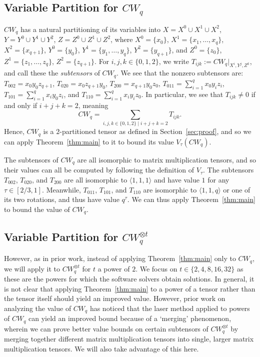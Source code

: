 \PassOptionsToPackage{shortlabels}{enumitem}\documentclass[10pt,a4paper]{article}
\begin{document}
\subsection{Variable Partition for \texorpdfstring{$CW_q$}{CWq}}

$CW_q$ has a natural partitioning of its variables into $X=X^0\cup X^1\cup X^2$, $Y=Y^0\cup Y^1\cup Y^2$, $Z=Z^0\cup Z^1\cup Z^2$, where $X^0=\{x_0\}$, $X^1=\{x_1,\ldots,x_q\}$, $X^2=\{x_{q+1}\}$, $Y^0=\{y_0\}$, $Y^1=\{y_1,\ldots,y_q\}$, $Y^2=\{y_{q+1}\}$, and $Z^0=\{z_0\}$, $Z^1=\{z_1,\ldots,z_q\}$, $Z^2=\{z_{q+1}\}$. 
For $i,j,k \in \{0,1,2\}$, we write $T_{ijk} := CW_q|_{X^i,Y^j,Z^k}$, and call these the \emph{subtensors} of $CW_q$. We see that the nonzero subtensors are: $T_{002}=x_0 y_0 z_{q+1}$, $T_{020}= x_0 z_{q+1} y_0$,  $T_{200}=x_{q+1} y_0 z_0$, $T_{011}=\sum_{i=1}^q x_0 y_i z_i$,  $T_{101}=\sum_{i=1}^q x_i y_0 z_i$, and $T_{110}=\sum_{i=1}^q x_i y_i z_0$. In particular, we see that $T_{ijk} \neq 0$ if and only if $i+j+k=2$, meaning
$$CW_q=\sum_{i,j,k\in \{0,1,2\} \mid i+j+k=2} T_{ijk}.$$
Hence, $CW_q$ is a $2$-partitioned tensor as defined in Section~\ref{sec:proof}, and so we can apply Theorem~\ref{thm:main} to it to bound its value $V_\tau(CW_q)$.

The subtensors of $CW_q$ are all isomorphic to matrix multiplication tensors, and so their values can all be computed by following the definition of $V_\tau$. The subtensors
$T_{002}$, $T_{020}$, and $T_{200}$ are all isomorphic to $\langle 1,1,1\rangle$ and have value $1$ for any $\tau \in [2/3,1]$. Meanwhile, $T_{011}$, $T_{101}$, and $T_{110}$ are isomorphic to $\langle 1,1,q\rangle$ or one of its two rotations, and thus have value $q^\tau$. We can thus apply Theorem~\ref{thm:main} to bound the value of $CW_q$. 


\subsection{Variable Partition for \texorpdfstring{$CW_q^{\otimes t}$}{CWqot}}

However, as in prior work, instead of applying Theorem~\ref{thm:main} only to $CW_q$, we will apply it to $CW_q^{\otimes t}$ for $t$ a power of $2$. We focus on $t \in \{2,4,8,16,32\}$ as these are the powers for which the software solvers obtain solutions. In general, it is not clear that applying Theorem~\ref{thm:main} to a power of a tensor rather than the tensor itself should yield an improved value. However, prior work on analyzing the value of $CW_q$ has noticed that the laser method applied to powers of $CW_q$ can yield an improved bound because of a `merging' phenomenon, wherein we can prove better value bounds on certain subtensors of $CW_q^{\otimes t}$ by merging together different matrix multiplication tensors into single, larger matrix multiplication tensors. We will also take advantage of this here. 
\end{document}
